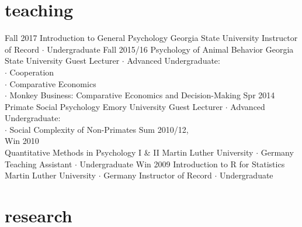\documentclass[]{friggeri-cv}
\begin{document}
\section{teaching}

\begin{entrylist}
  \entry
    {Fall 2017}
    {Introduction to General Psychology}
    {Georgia State University}
    {Instructor of Record $\cdot$ Undergraduate}
  \entry
    {Fall 2015/16}
    {Psychology of Animal Behavior}
    {Georgia State University}
    {Guest Lecturer $\cdot$ Advanced Undergraduate:\\ 
    $\cdot$ Cooperation\\
    $\cdot$ Comparative Economics\\
    $\cdot$ Monkey Business: Comparative Economics and Decision-Making}
  \entry
    {Spr 2014}
    {Primate Social Psychology}
    {Emory University}
    {Guest Lecturer $\cdot$ Advanced Undergraduate:\\
    $\cdot$ Social Complexity of Non-Primates}
  \entry
    {Sum 2010/12,\\Win 2010\\[-.85cm]}
    {Quantitative Methods in Psychology I \& II}
    {Martin Luther University $\cdot$ Germany}
    {Teaching Assistant $\cdot$ Undergraduate}
  \entry
    {Win 2009}
    {Introduction to R for Statistics}
    {Martin Luther University $\cdot$ Germany}
    {Instructor of Record $\cdot$ Undergraduate}
\end{entrylist}


\section{research}
\end{document}
